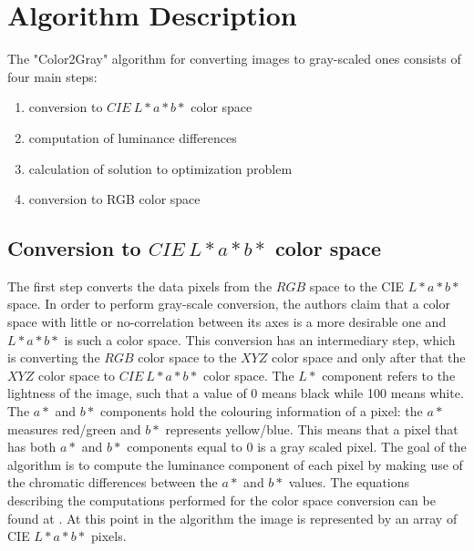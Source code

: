 \documentclass[conference]{IEEEtran}
\begin{document}
\section{Algorithm Description}
The "Color2Gray" algorithm  for converting images to gray-scaled ones \cite{gooch2005color2gray} consists of four main steps:
\begin{enumerate}
	\item conversion to $\mathit{CIE\ L*a*b*}$ color space
	\item computation of luminance differences
	\item calculation of solution to optimization problem
	\item conversion to RGB color space
\end{enumerate}
\subsection{Conversion to $\mathit{CIE\ L*a*b*}$ color space}
The first step converts the data pixels from the $\mathit{RGB}$ space to the  CIE $\mathit{L*a*b*}$ space. In order to perform gray-scale conversion, the authors \cite{gooch2005color2gray} claim that a color space with little or no-correlation between its axes is a more desirable one and $\mathit{L*a*b*}$ is such a color space. This conversion has an intermediary step, which is converting the $\mathit{RGB}$ color space to the $\mathit{XYZ}$ color space and only after that the $\mathit{XYZ}$ color space to $\mathit{CIE\ L*a*b*}$ color space. The $\mathit{L* }$ component refers to the lightness of the image, such that a value of 0 means black while 100 means white. The $\mathit{a*}$ and $\mathit{b*}$ components hold the colouring information of a pixel: the $\mathit{a*}$ measures red/green and $\mathit{b*}$ represents yellow/blue. This means that a pixel that has both $\mathit{a*}$ and $\mathit{b*}$ components equal to $\mathit{0}$ is a gray scaled pixel. The goal of the algorithm is to compute the luminance component of each pixel by making use of the chromatic differences between the $\mathit{a*}$ and $\mathit{b*}$ values. The equations describing the computations performed for the color space conversion can be found at \cite{ford1998colour}. At this point in the algorithm the image is represented by an array of CIE $\mathit{L*a*b*}$ pixels.\\
\end{document}
